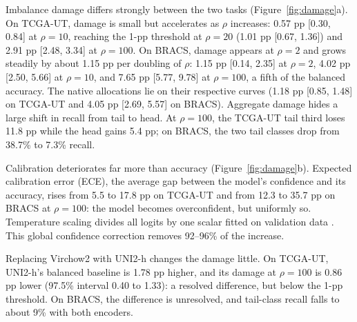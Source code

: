\documentclass[11pt]{article}
\begin{document}
Imbalance damage differs strongly between the two tasks (Figure~\ref{fig:damage}a). On TCGA-UT, damage is small but accelerates as $\rho$ increases: 0.57 pp [0.30, 0.84] at $\rho=10$, reaching the 1-pp threshold at $\rho=20$ (1.01 pp [0.67, 1.36]) and 2.91 pp [2.48, 3.34] at $\rho=100$. On BRACS, damage appears at $\rho=2$ and grows steadily by about 1.15 pp per doubling of $\rho$: 1.15 pp [0.14, 2.35] at $\rho=2$, 4.02 pp [2.50, 5.66] at $\rho=10$, and 7.65 pp [5.77, 9.78] at $\rho=100$, a fifth of the balanced accuracy. The native allocations lie on their respective curves (1.18 pp [0.85, 1.48] on TCGA-UT and 4.05 pp [2.69, 5.57] on BRACS). Aggregate damage hides a large shift in recall from tail to head. At $\rho=100$, the TCGA-UT tail third loses 11.8 pp while the head gains 5.4 pp; on BRACS, the two tail classes drop from 38.7\% to 7.3\% recall.

Calibration deteriorates far more than accuracy (Figure~\ref{fig:damage}b). Expected calibration error (ECE), the average gap between the model's confidence and its accuracy, rises from 5.5 to 17.8 pp on TCGA-UT and from 12.3 to 35.7 pp on BRACS at $\rho=100$: the model becomes overconfident, but uniformly so. Temperature scaling divides all logits by one scalar fitted on validation data \citep{guo2017calibration}. This global confidence correction removes 92--96\% of the increase.

Replacing Virchow2 with UNI2-h changes the damage little. On TCGA-UT, UNI2-h's balanced baseline is 1.78 pp higher, and its damage at $\rho=100$ is 0.86 pp lower (97.5\% interval 0.40 to 1.33): a resolved difference, but below the 1-pp threshold. On BRACS, the difference is unresolved, and tail-class recall falls to about 9\% with both encoders.
\end{document}
